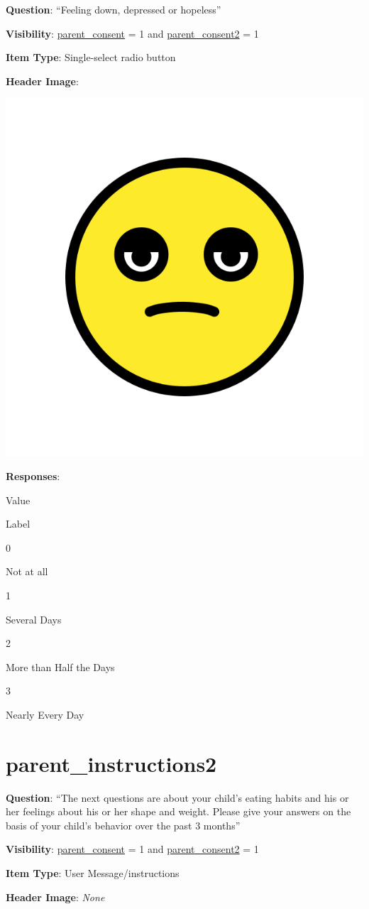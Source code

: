 \documentclass[]{book}
\begin{document}
\textbf{Question}: ``Feeling down, depressed or hopeless''

\textbf{Visibility}: \protect\hyperlink{parent_consent}{parent\_consent} = 1 and \protect\hyperlink{parent_consent2}{parent\_consent2} = 1

\textbf{Item Type}: Single-select radio button

\textbf{Header Image}:

\begin{flushleft}\includegraphics[width=0.33\linewidth]{downloadFigs4latex_HBN_PMHS_Codebook/parent_Q21score_headerImg} \end{flushleft}

\textbf{Responses}:

Value

Label

0

Not at all

1

Several Days

2

More than Half the Days

3

Nearly Every Day

\hypertarget{parent_instructions2}{%
\section{parent\_instructions2}\label{parent_instructions2}}

\textbf{Question}: ``The next questions are about your child's eating habits and his or her feelings about his or her shape and weight. Please give your answers on the basis of your child's behavior over the past 3 months''

\textbf{Visibility}: \protect\hyperlink{parent_consent}{parent\_consent} = 1 and \protect\hyperlink{parent_consent2}{parent\_consent2} = 1

\textbf{Item Type}: User Message/instructions

\textbf{Header Image}: \emph{None}
\end{document}
